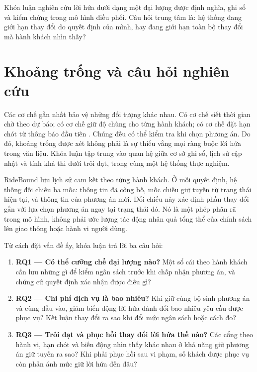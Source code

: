 \begin{khungy}
Khóa luận nghiên cứu lời hứa dưới dạng một đại lượng được định nghĩa, ghi sổ và kiểm chứng
trong mô hình điều phối. Câu hỏi trung tâm là: hệ thống đang giới hạn thay đổi do quyết định
của mình, hay đang giới hạn toàn bộ thay đổi mà hành khách nhìn thấy?
\end{khungy}

\section{Khoảng trống và câu hỏi nghiên cứu}

Các cơ chế gần nhất bảo vệ những đối tượng khác nhau. Có cơ chế siết thời gian chờ theo dự
báo; có cơ chế giữ độ chùng cho từng hành khách; có cơ chế đặt hạn chót từ thông báo đầu
tiên \cite{fielbaum2020,elmi2026,schulz2026}. Chúng đều có thể kiểm tra khi chọn phương án.
Do đó, khoảng trống được xét không phải là sự thiếu vắng mọi ràng buộc lời hứa trong văn liệu.
Khóa luận tập trung vào quan hệ giữa cơ sở ghi sổ, lịch sử cập nhật và tính khả thi dưới
trôi dạt, trong cùng một hệ thống thực nghiệm.

RideBound lưu lịch sử cam kết theo từng hành khách. Ở mỗi quyết định, hệ thống đối chiếu
ba mốc: thông tin đã công bố, mốc chiếu giữ tuyến từ trạng thái hiện tại,
và thông tin của phương án mới. Đối chiếu này xác định phần thay đổi gắn với lựa chọn
phương án ngay tại trạng thái đó. Nó là một phép phân rã trong mô hình, không phải ước
lượng tác động nhân quả tổng thể của chính sách lên giao thông hoặc hành vi người dùng.

Từ cách đặt vấn đề ấy, khóa luận trả lời ba câu hỏi:

\begin{enumerate}[leftmargin=1.2cm,itemsep=5pt,topsep=4pt]
\item \textbf{RQ1 --- Có thể cưỡng chế đại lượng nào?} Một sổ cái theo hành khách cần lưu
những gì để kiểm ngân sách trước khi chấp nhận phương án, và chứng cứ quyết định xác nhận
được điều gì?
\item \textbf{RQ2 --- Chi phí dịch vụ là bao nhiêu?} Khi giữ cùng bộ sinh phương án và
cùng đầu vào, giảm biến động lời hứa đánh đổi bao nhiêu yêu cầu được phục vụ? Kết luận thay
đổi ra sao khi đổi mức ngân sách hoặc cách đo?
\item \textbf{RQ3 --- Trôi dạt và phục hồi thay đổi lời hứa thế nào?} Các cổng theo hành vi,
hạn chót và biến động nhìn thấy khác nhau ở khả năng giữ phương án giữ tuyến ra sao? Khi
phải phục hồi sau vi phạm, số khách được phục vụ còn phản ánh mức giữ lời hứa đến đâu?
\end{enumerate}

